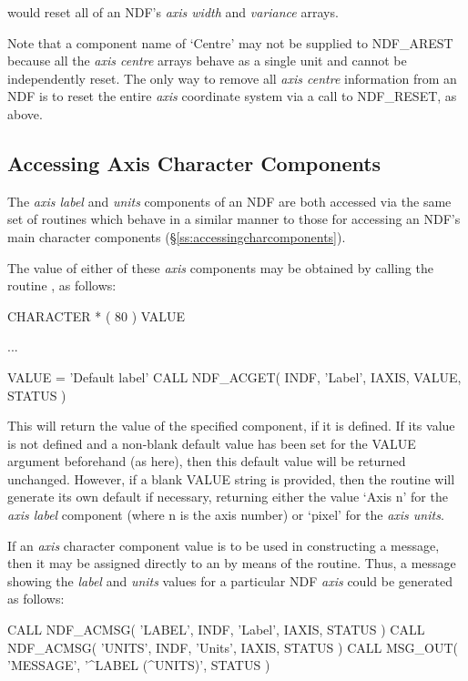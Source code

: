 \documentclass[twoside,11pt,nolof]{starlink}
\providecommand{\st}[1]{{\emph{#1}}}
\begin{document}
would reset all of an NDF's \st{axis width\/} and \st{variance\/} arrays.

Note that a component name of `Centre' may not be supplied to
NDF\_AREST because all the \st{axis centre\/} arrays behave as a single
unit and cannot be independently reset.
The only way to remove all \st{axis centre\/} information from an NDF is to
reset the entire \st{axis\/} coordinate system via a call to NDF\_RESET, as
above.

\subsection{\label{ss:acmsg}Accessing Axis Character Components}

The \st{axis label\/} and \st{units\/} components of an NDF are both
accessed via the same set of routines which behave in a similar manner to
those for accessing an NDF's main character components
(\S\ref{ss:accessingcharcomponents}).

The value of either of these \st{axis\/} components may be obtained by
calling the routine , as follows:

\small
\begin{terminalv}
      CHARACTER * ( 80 ) VALUE

      ...

      VALUE = 'Default label'
      CALL NDF_ACGET( INDF, 'Label', IAXIS, VALUE, STATUS )
\end{terminalv}
\normalsize

This will return the value of the specified component, if it is defined.
If its value is not defined and a non-blank default value has been set for
the VALUE argument beforehand (as here), then this default value will be
returned unchanged.
However, if a blank VALUE string is provided, then the routine will generate
its own default if necessary, returning either the value `Axis n' for the
\st{axis label\/} component (where n is the axis number) or `pixel' for the
\st{axis units}.

If an \st{axis\/} character component value is to be used in
constructing a message, then it may be assigned directly to an
 by means of the 
routine.
Thus, a message showing the \st{label\/} and \st{units\/} values for a
particular NDF \st{axis\/} could be generated as follows:

\small
\begin{terminalv}
      CALL NDF_ACMSG( 'LABEL', INDF, 'Label', IAXIS, STATUS )
      CALL NDF_ACMSG( 'UNITS', INDF, 'Units', IAXIS, STATUS )
      CALL MSG_OUT( 'MESSAGE', '^LABEL (^UNITS)', STATUS )
\end{terminalv}
\normalsize
\end{document}
